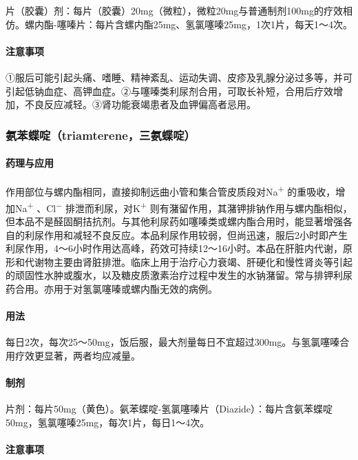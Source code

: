 片（胶囊）剂：每片（胶囊）20mg（微粒），微粒20mg与普通制剂100mg的疗效相仿。螺内酯-噻嗪片：每片含螺内酯25mg、氢氯噻嗪25mg，1次1片，每天1～4次。

\paragraph{注意事项}

①服后可能引起头痛、嗜睡、精神紊乱、运动失调、皮疹及乳腺分泌过多等，并可引起低钠血症、高钾血症。②与噻嗪类利尿剂合用，可取长补短，合用后疗效增加，不良反应减轻。③肾功能衰竭患者及血钾偏高者忌用。

\subsubsection{氨苯蝶啶（triamterene，三氨蝶啶）}

\paragraph{药理与应用}

作用部位与螺内酯相同，直接抑制远曲小管和集合管皮质段对Na\textsuperscript{+}
的重吸收，增加Na\textsuperscript{+} 、Cl\textsuperscript{−}
排泄而利尿，对K\textsuperscript{+}
则有潴留作用，其潴钾排钠作用与螺内酯相似，但本品不是醛固酮拮抗剂。与其他利尿药如噻嗪类或螺内酯合用时，能显著增强各自的利尿作用和减轻不良反应。本品利尿作用较弱，但尚迅速，服后2小时即产生利尿作用，4～6小时作用达高峰，药效可持续12～16小时。本品在肝脏内代谢，原形和代谢物主要由肾脏排泄。临床上用于治疗心力衰竭、肝硬化和慢性肾炎等引起的顽固性水肿或腹水，以及糖皮质激素治疗过程中发生的水钠潴留。常与排钾利尿药合用。亦用于对氢氯噻嗪或螺内酯无效的病例。

\paragraph{用法}

每日2次，每次25～50mg，饭后服，最大剂量每日不宜超过300mg。与氢氯噻嗪合用疗效更显著，两者均应减量。

\paragraph{制剂}

片剂：每片50mg（黄色）。氨苯蝶啶-氢氯噻嗪片（Diazide）：每片含氨苯蝶啶50mg，氢氯噻嗪25mg，每次1片，每日1～4次。

\paragraph{注意事项}


